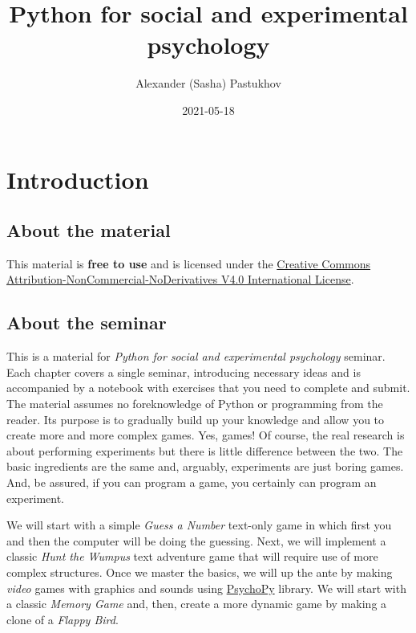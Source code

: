 \documentclass[
]{book}
\title{Python for social and experimental psychology}
\author{Alexander (Sasha) Pastukhov}
\date{2021-05-18}
\begin{document}
\maketitle

{
\setcounter{tocdepth}{1}
\tableofcontents
}
\hypertarget{introduction}{%
\chapter*{Introduction}\label{introduction}}

\hypertarget{about-the-material}{%
\section*{About the material}\label{about-the-material}}

This material is \textbf{free to use} and is licensed under the \href{https://creativecommons.org/licenses/by-nc-nd/4.0/}{Creative Commons Attribution-NonCommercial-NoDerivatives V4.0 International License}.

\hypertarget{about-the-seminar}{%
\section*{About the seminar}\label{about-the-seminar}}

This is a material for \emph{Python for social and experimental psychology} seminar. Each chapter covers a single seminar, introducing necessary ideas and is accompanied by a notebook with exercises that you need to complete and submit. The material assumes no foreknowledge of Python or programming from the reader. Its purpose is to gradually build up your knowledge and allow you to create more and more complex games. Yes, games! Of course, the real research is about performing experiments but there is little difference between the two. The basic ingredients are the same and, arguably, experiments are just boring games. And, be assured, if you can program a game, you certainly can program an experiment.

We will start with a simple \emph{Guess a Number} text-only game in which first you and then the computer will be doing the guessing. Next, we will implement a classic \emph{Hunt the Wumpus} text adventure game that will require use of more complex structures. Once we master the basics, we will up the ante by making \emph{video} games with graphics and sounds using \href{https://psychopy.org/}{PsychoPy} library. We will start with a classic \emph{Memory Game} and, then, create a more dynamic game by making a clone of a \emph{Flappy Bird}.
\end{document}
